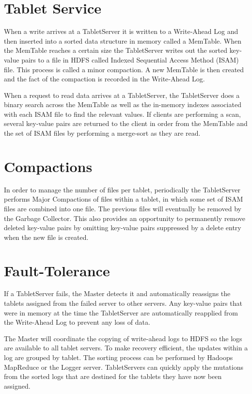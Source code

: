 \section{Tablet Service}


When a write arrives at a TabletServer it is written to a Write‐Ahead Log and
then inserted into a sorted data structure in memory called a MemTable. When the
MemTable reaches a certain size the TabletServer writes out the sorted key-value
pairs to a file in HDFS called Indexed Sequential Access Method (ISAM)
file. This process is called a minor compaction.  A new MemTable is then created
and the fact of the compaction is recorded in the Write‐Ahead Log.

When a request to read data arrives at a TabletServer, the TabletServer does a
binary search across the MemTable as well as the in-memory indexes associated
with each ISAM file to find the relevant values. If clients are performing a
scan, several key‐value pairs are returned to the client in order from the
MemTable and the set of ISAM files by performing a merge‐sort as they are read.

\section{Compactions}

In order to manage the number of files per tablet, periodically the TabletServer
performs Major Compactions of files within a tablet, in which some set of ISAM
files are combined into one file. The previous files will eventually be removed
by the Garbage Collector. This also provides an opportunity to permanently
remove deleted key‐value pairs by omitting key‐value pairs suppressed by a
delete entry when the new file is created.

\section{Fault-Tolerance}

If a TabletServer fails, the Master detects it and automatically reassigns the tablets
assigned from the failed server to other servers. Any key-value pairs that were in
memory at the time the TabletServer are automatically reapplied from the Write-Ahead
Log to prevent any loss of data.

The Master will coordinate the copying of write-ahead logs to HDFS so the logs
are available to all tablet servers. To make recovery efficient, the updates
within a log are grouped by tablet.  The sorting process can be performed by
Hadoops MapReduce or the Logger server. TabletServers can quickly apply the
mutations from the sorted logs that are destined for the tablets they have now
been assigned.

